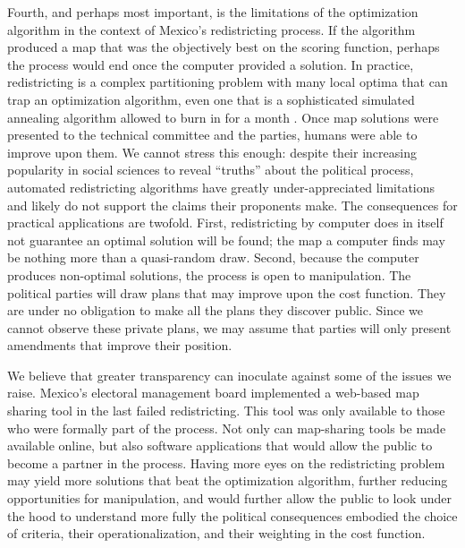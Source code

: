 \documentclass[letter,12pt]{article}
\begin{document}
Fourth, and perhaps most important, is the limitations of the optimization algorithm in the context of Mexico's redistricting process. If the algorithm produced a map that was the objectively best on the scoring function, perhaps the process would end once the computer provided a solution. In practice, redistricting is a complex partitioning problem with many local optima that can trap an optimization algorithm, even one that is a sophisticated simulated annealing algorithm allowed to burn in for a month \citep{altman.mcdonald2011bard}. Once map solutions were presented to the technical committee and the parties, humans were able to improve upon them. We cannot stress this enough: despite their increasing popularity in social sciences to reveal ``truths'' about the political process, automated redistricting algorithms have greatly under-appreciated limitations and likely do not support the claims their proponents make. The consequences for practical applications are twofold. First, redistricting by computer does in itself not guarantee an optimal solution will be found; the map a computer finds may be nothing more than a quasi-random draw. Second, because the computer produces non-optimal solutions, the process is open to manipulation. The political parties will draw plans that may improve upon the cost function. They are under no obligation to make all the plans they discover public. Since we cannot observe these private plans, we may assume that parties will only present amendments that improve their position.

We believe that greater transparency can inoculate against some of the issues we raise. Mexico's electoral management board implemented a web-based map sharing tool in the last failed redistricting. This tool was only available to those who were formally part of the process. Not only can map-sharing tools be made available online, but also software applications that would allow the public to become a partner in the process. Having more eyes on the redistricting problem may yield more solutions that beat the optimization algorithm, further reducing opportunities for manipulation, and would further allow the public to look under the hood to understand more fully the political consequences embodied the choice of criteria, their operationalization, and their weighting in the cost function.


\end{document}
